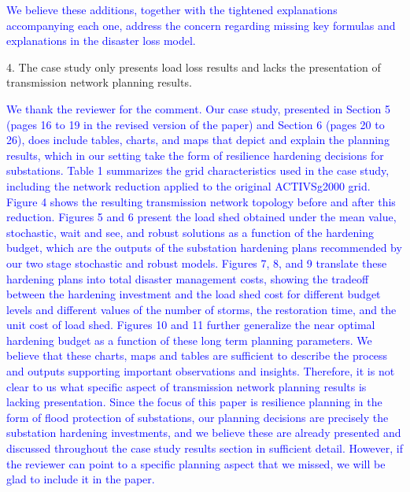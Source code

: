 \documentclass[authoryear,preprint,review,12pt]{elsarticle}\usepackage{amssymb}
\begin{document}
\textcolor{blue}{We believe these additions, together with the tightened explanations accompanying each one, address the concern regarding missing key formulas and explanations in the disaster loss model.}

4. The case study only presents load loss results and lacks the presentation of transmission network planning results.


\textcolor{blue}{We thank the reviewer for the comment. Our case study, presented in Section 5 (pages 16 to 19 in the revised version of the paper) and Section 6 (pages 20 to 26), does include tables, charts, and maps that depict and explain the planning results, which in our setting take the form of resilience hardening decisions for substations. Table 1 summarizes the grid characteristics used in the case study, including the network reduction applied to the original ACTIVSg2000 grid. Figure 4 shows the resulting transmission network topology before and after this reduction. Figures 5 and 6 present the load shed obtained under the mean value, stochastic, wait and see, and robust solutions as a function of the hardening budget, which are the outputs of the substation hardening plans recommended by our two stage stochastic and robust models. Figures 7, 8, and 9 translate these hardening plans into total disaster management costs, showing the tradeoff between the hardening investment and the load shed cost for different budget levels and different values of the number of storms, the restoration time, and the unit cost of load shed. Figures 10 and 11 further generalize the near optimal hardening budget as a function of these long term planning parameters. We believe that these charts, maps and tables are sufficient to describe the process and outputs supporting important observations and insights. Therefore, it is not clear to us what specific aspect of transmission network planning results is lacking presentation. Since the focus of this paper is resilience planning in the form of flood protection of substations, our planning decisions are precisely the substation hardening investments, and we believe these are already presented and discussed throughout the case study results section in sufficient detail. However, if the reviewer can point to a specific planning aspect that we missed, we will be glad to include it in the paper.}

%
%
\end{document}
